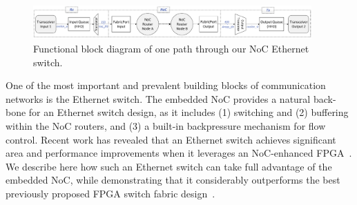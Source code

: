 %
%
%
%



\begin{figure}[t] \centering \vspace{0cm}
\includegraphics[width=0.95\textwidth, trim = 0cm 0.15cm 0cm 0.3cm]{images/complete-switch-path-new.pdf}
\caption{Functional block diagram of one path through our NoC Ethernet switch.}
\label{fig:switch-blk-diagram}
\vspace{0cm}
\end{figure}

One of the most important and prevalent building blocks of communication networks is the Ethernet switch.
The embedded NoC provides a natural back-bone for an Ethernet switch design, as it includes (1) switching and (2) buffering within the NoC routers, and (3) a built-in backpressure mechanism for flow control.
Recent work has revealed that an Ethernet switch achieves significant area and performance improvements when it leverages an NoC-enhanced FPGA~\cite{Bitar2014}.
We describe here how such an Ethernet switch can take full advantage of the embedded NoC, while demonstrating that it considerably outperforms the best previously proposed FPGA switch fabric design~\cite{dai-zhu}.

\newpage

